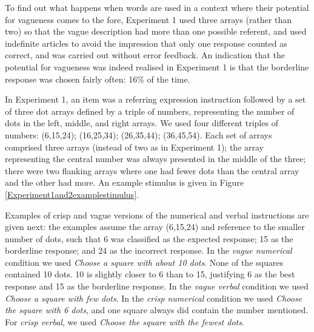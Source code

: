 
To find out what happens when words are used in a context where their potential for vagueness comes to the fore, Experiment 1 used three arrays (rather than two) so that the vague description had more than one possible referent, and used indefinite articles to avoid the impression that only one response counted as correct, and was carried out without error feedback. An indication that the potential for vagueness was indeed realised in Experiment 1 is that the borderline response was chosen fairly often: 16\% of the time.

In Experiment 1, an item was a referring expression instruction followed by a set of three dot arrays defined by a triple of numbers, representing the number of dots in the left, middle, and right arrays. We used four different triples of numbers: (6,15,24); (16,25,34); (26,35,44); (36,45,54). Each set of arrays comprised three arrays (instead of two as in Experiment 1); the array representing the central number was always presented in the middle of the three; there were two flanking arrays where one had fewer dots than the central array and the other had more. An example stimulus is given in Figure \ref{Experiment1and2examplestimulus}.

Examples of crisp and vague versions of the numerical and verbal instructions are given next: the examples assume the array (6,15,24) and reference to the smaller number of dots, such that 6 was classified as the expected response; 15 as the borderline response; and 24 as the incorrect response. In the {\em vague numerical} condition we used \emph{Choose a square with about 10 dots}. None of the squares contained 10 dots. 10 is slightly closer to 6 than to 15, justifying 6 as the best response and 15 as the borderline response. In the {\em vague verbal} condition we used \emph{Choose a square with few dots}. In the {\em crisp numerical} condition we used \emph{Choose the square with 6 dots}, and one square always did contain the number mentioned. For {\em crisp verbal}, we used \emph{Choose the square with the fewest dots}.

